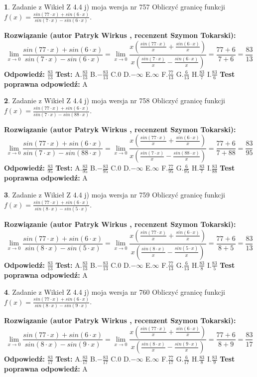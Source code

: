 \documentclass[12pt, a4paper]{article}
\theoremstyle{definition} %
\newtheorem{zad}{}
\newcommand{\zadStart}[1]{\begin{zad}#1\newline}
\newcommand{\zadStop}{\end{zad}}
\newcommand{\rozwStart}[2]{\noindent \textbf{Rozwiązanie (autor #1 , recenzent #2): }\newline}
\newcommand{\rozwStop}{\newline}
\newcommand{\odpStart}{\noindent \textbf{Odpowiedź:}\newline}
\newcommand{\odpStop}{\newline}
\newcommand{\testStart}{\noindent \textbf{Test:}\newline}
\newcommand{\testStop}{\newline}
\newcommand{\kluczStart}{\noindent \textbf{Test poprawna odpowiedź:}\newline}
\newcommand{\kluczStop}{\newline}
\begin{document}
\zadStart{Zadanie z Wikieł Z 4.4 j) moja wersja nr 757}
Obliczyć granicę funkcji $f(x)=\frac{sin(77\cdot x) +sin(6\cdot x)}{sin(7\cdot x) -sin(6\cdot x)}$.
\zadStop
\rozwStart{Patryk Wirkus}{Szymon Tokarski}
$$\lim\limits_{x\to 0}\frac{sin(77\cdot x) +sin(6\cdot x)}{sin(7\cdot x) -sin(6\cdot x)}=\lim\limits_{x\to 0}\frac{x(\frac{sin(77\cdot x)}{x}+\frac{sin(6\cdot x)}{x})}{x(\frac{sin(7\cdot x)}{x}-\frac{sin(6\cdot x)}{x})}=\frac{77+6}{7+6} = \frac{83}{13}$$
\rozwStop
\odpStart
$\frac{83}{13}$
\odpStop
\testStart
A.$\frac{83}{13}$
B.$-\frac{83}{13}$
C.$0$
D.$-\infty$
E.$\infty$
F.$\frac{77}{13}$
G.$\frac{6}{13}$
H.$\frac{83}{7}$
I.$\frac{83}{6}$
\testStop
\kluczStart
A
\kluczStop



\zadStart{Zadanie z Wikieł Z 4.4 j) moja wersja nr 758}
Obliczyć granicę funkcji $f(x)=\frac{sin(77\cdot x) +sin(6\cdot x)}{sin(7\cdot x) -sin(88\cdot x)}$.
\zadStop
\rozwStart{Patryk Wirkus}{Szymon Tokarski}
$$\lim\limits_{x\to 0}\frac{sin(77\cdot x) +sin(6\cdot x)}{sin(7\cdot x) -sin(88\cdot x)}=\lim\limits_{x\to 0}\frac{x(\frac{sin(77\cdot x)}{x}+\frac{sin(6\cdot x)}{x})}{x(\frac{sin(7\cdot x)}{x}-\frac{sin(88\cdot x)}{x})}=\frac{77+6}{7+88} = \frac{83}{95}$$
\rozwStop
\odpStart
$\frac{83}{95}$
\odpStop
\testStart
A.$\frac{83}{95}$
B.$-\frac{83}{95}$
C.$0$
D.$-\infty$
E.$\infty$
F.$\frac{77}{95}$
G.$\frac{6}{95}$
H.$\frac{83}{7}$
I.$\frac{83}{88}$
\testStop
\kluczStart
A
\kluczStop



\zadStart{Zadanie z Wikieł Z 4.4 j) moja wersja nr 759}
Obliczyć granicę funkcji $f(x)=\frac{sin(77\cdot x) +sin(6\cdot x)}{sin(8\cdot x) -sin(5\cdot x)}$.
\zadStop
\rozwStart{Patryk Wirkus}{Szymon Tokarski}
$$\lim\limits_{x\to 0}\frac{sin(77\cdot x) +sin(6\cdot x)}{sin(8\cdot x) -sin(5\cdot x)}=\lim\limits_{x\to 0}\frac{x(\frac{sin(77\cdot x)}{x}+\frac{sin(6\cdot x)}{x})}{x(\frac{sin(8\cdot x)}{x}-\frac{sin(5\cdot x)}{x})}=\frac{77+6}{8+5} = \frac{83}{13}$$
\rozwStop
\odpStart
$\frac{83}{13}$
\odpStop
\testStart
A.$\frac{83}{13}$
B.$-\frac{83}{13}$
C.$0$
D.$-\infty$
E.$\infty$
F.$\frac{77}{13}$
G.$\frac{6}{13}$
H.$\frac{83}{8}$
I.$\frac{83}{5}$
\testStop
\kluczStart
A
\kluczStop



\zadStart{Zadanie z Wikieł Z 4.4 j) moja wersja nr 760}
Obliczyć granicę funkcji $f(x)=\frac{sin(77\cdot x) +sin(6\cdot x)}{sin(8\cdot x) -sin(9\cdot x)}$.
\zadStop
\rozwStart{Patryk Wirkus}{Szymon Tokarski}
$$\lim\limits_{x\to 0}\frac{sin(77\cdot x) +sin(6\cdot x)}{sin(8\cdot x) -sin(9\cdot x)}=\lim\limits_{x\to 0}\frac{x(\frac{sin(77\cdot x)}{x}+\frac{sin(6\cdot x)}{x})}{x(\frac{sin(8\cdot x)}{x}-\frac{sin(9\cdot x)}{x})}=\frac{77+6}{8+9} = \frac{83}{17}$$
\rozwStop
\odpStart
$\frac{83}{17}$
\odpStop
\testStart
A.$\frac{83}{17}$
B.$-\frac{83}{17}$
C.$0$
D.$-\infty$
E.$\infty$
F.$\frac{77}{17}$
G.$\frac{6}{17}$
H.$\frac{83}{8}$
I.$\frac{83}{9}$
\testStop
\kluczStart
A
\kluczStop
\end{document}
